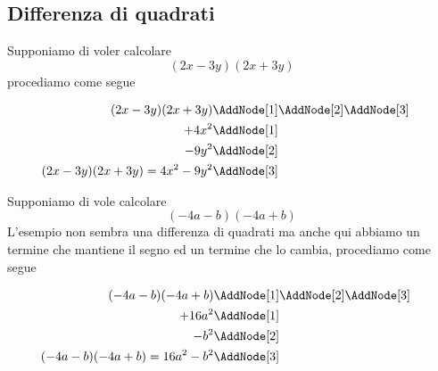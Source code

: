 \subsection{Differenza di quadrati}
\begin{esempiot}{}{}
Supponiamo di voler calcolare \[(2x-3y)(2x+3y)\]
procediamo come segue
\begin{NodesList}
	\begin{align*}
		(2x-3y)(2x+3y)&\AddNode[1]\AddNode[2]\AddNode[3]\\
		+4x^2&\AddNode[1]&\\ 
		-9y^2&\AddNode[2]&\\
		(2x-3y)(2x+3y)=4x^2-9y^2&\AddNode[3]
	\end{align*}
\end{NodesList}
\end{esempiot}
\begin{esempiot}{}{}
Supponiamo di vole calcolare \[(-4a-b)(-4a+b)\]
L'esempio non sembra una differenza di quadrati ma anche qui abbiamo un termine che mantiene il segno ed un termine che lo cambia, procediamo come segue
\begin{NodesList}
	\begin{align*}
		(-4a-b)(-4a+b)&\AddNode[1]\AddNode[2]\AddNode[3]\\
		+16a^2&\AddNode[1]&\\ 
		-b^2&\AddNode[2]&\\
		(-4a-b)(-4a+b)=16a^2-b^2&\AddNode[3]
	\end{align*}
\end{NodesList}
\end{esempiot}
